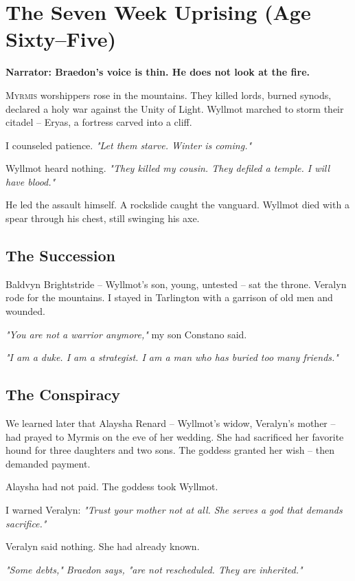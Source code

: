 \documentclass[11pt]{book}
\begin{document}
\chapter{The Seven Week Uprising (Age Sixty--Five)}

\textbf{Narrator: Braedon's voice is thin. He does not look at the fire.}

\lettrine{M}{yrmis} worshippers rose in the mountains. They killed lords, burned synods, declared a holy war against the Unity of Light. Wyllmot marched to storm their citadel -- Eryas, a fortress carved into a cliff.

I counseled patience. \emph{"Let them starve. Winter is coming."}

Wyllmot heard nothing. \emph{"They killed my cousin. They defiled a temple. I will have blood."}

He led the assault himself. A rockslide caught the vanguard. Wyllmot died with a spear through his chest, still swinging his axe.

\section*{The Succession}
Baldvyn Brightstride -- Wyllmot's son, young, untested -- sat the throne. Veralyn rode for the mountains. I stayed in Tarlington with a garrison of old men and wounded.

\emph{"You are not a warrior anymore,"} my son Constano said.

\emph{"I am a duke. I am a strategist. I am a man who has buried too many friends."}

\section*{The Conspiracy}
We learned later that Alaysha Renard -- Wyllmot's widow, Veralyn's mother -- had prayed to Myrmis on the eve of her wedding. She had sacrificed her favorite hound for three daughters and two sons. The goddess granted her wish -- then demanded payment.

Alaysha had not paid. The goddess took Wyllmot.

I warned Veralyn: \emph{"Trust your mother not at all. She serves a god that demands sacrifice."}

Veralyn said nothing. She had already known.

\vspace{1em}
\noindent\textit{"Some debts," Braedon says, "are not rescheduled. They are inherited."}
\end{document}

